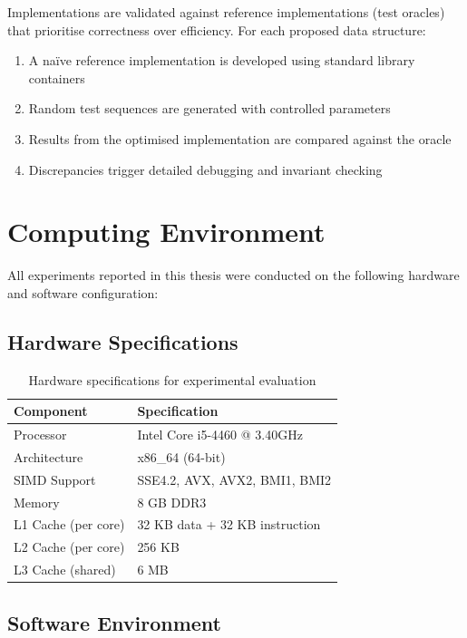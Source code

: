 Implementations are validated against reference implementations (test oracles) that prioritise correctness over efficiency. For each proposed data structure:

\begin{enumerate}
    \item A na\"ive reference implementation is developed using standard library containers
    \item Random test sequences are generated with controlled parameters
    \item Results from the optimised implementation are compared against the oracle
    \item Discrepancies trigger detailed debugging and invariant checking
\end{enumerate}

\section{Computing Environment}
\label{sec:computing-env}

All experiments reported in this thesis were conducted on the following hardware and software configuration:

\subsection{Hardware Specifications}

\begin{table}[H]
\centering
\begin{tabular}{|l|l|}
\hline
\textbf{Component} & \textbf{Specification} \\
\hline
Processor & Intel Core i5-4460 @ 3.40GHz \\
Architecture & x86\_64 (64-bit) \\
SIMD Support & SSE4.2, AVX, AVX2, BMI1, BMI2 \\
Memory & 8 GB DDR3 \\
L1 Cache (per core) & 32 KB data + 32 KB instruction \\
L2 Cache (per core) & 256 KB \\
L3 Cache (shared) & 6 MB \\
\hline
\end{tabular}
\caption{Hardware specifications for experimental evaluation}
\label{tab:hardware}
\end{table}

\subsection{Software Environment}

